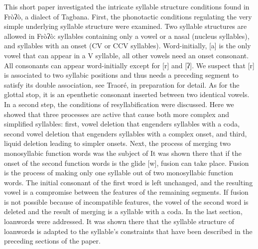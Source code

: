 This short paper investigated the intricate syllable structure conditions found in Fròʔò, a dialect of Tagbana. First, the phonotactic conditions regulating the very simple underlying syllable structure were examined. Two syllable structures are allowed in Fròʔò: syllables containing only a vowel or a nasal (nucleus syllables), and syllables with an onset (CV or CCV syllables). Word-initially, [a] is the only vowel that can appear in a V syllable, all other vowels need an onset consonant. All consonants can appear word-initially except for [r] and [ʔ]. We suspect that [r] is associated to two syllabic positions and thus needs a preceding segment to satisfy its double association, see Traoré, in preparation for detail. As for the glottal stop, it is an epenthetic consonant inserted between two identical vowels. In a second step, the conditions of resyllabification were discussed. Here we showed that three processes are active that cause both more complex and simplified syllables: first, vowel deletion that engenders syllables with a coda, second vowel deletion that engenders syllables with a complex onset, and third, liquid deletion leading to simpler onsets. Next, the process of merging two monosyllabic function words was the subject of  It was shown there that if the onset of the second function words is the glide [w], fusion can take place. Fusion is the process of making only one syllable out of two monosyllabic function words. The initial consonant of the first word is left unchanged, and the resulting vowel is a compromise between the features of the remaining segments. If fusion is not possible because of incompatible features, the vowel of the second word is deleted and the result of merging is a syllable with a coda. In the last section, loanwords were addressed. It was shown there that the syllable structure of loanwords is adapted to the syllable’s constraints that have been described in the preceding sections of the paper.  
